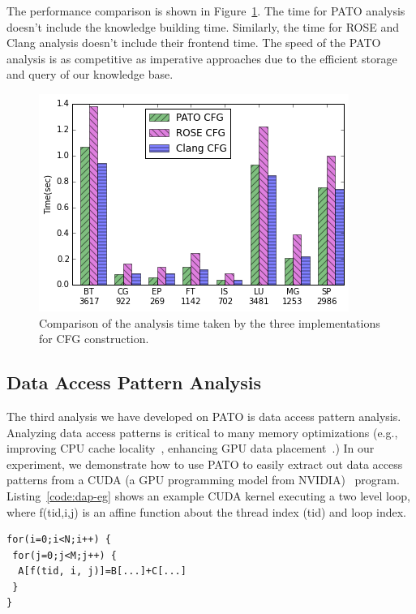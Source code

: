 The performance comparison is shown in Figure~\ref{fig:npb-cfg}.  The
time for PATO analysis doesn't include the knowledge building time.
Similarly, the time for ROSE and Clang analysis doesn't include their
frontend time.  The speed of the PATO analysis is as competitive as
imperative approaches due to the efficient storage and query of our
knowledge base.
\begin{figure}[h]
	\centering
	\includegraphics[width=.6\columnwidth]{graph/npb-cfg.png}
	\caption{Comparison of the analysis time taken by the three
          implementations for CFG construction.}
	\label{fig:npb-cfg}
\end{figure}

\subsection{Data Access Pattern Analysis}

The third analysis we have developed on PATO is data access pattern
analysis. Analyzing data access patterns is critical to many memory
optimizations (e.g., improving CPU cache
locality~\cite{kandemir1999improving}, enhancing GPU data
placement~\cite{Chen2014, Jang2011}.)  In our experiment, we
demonstrate how to use PATO to easily extract out data access patterns
from a CUDA (a GPU programming model from NVIDIA)~\cite{nvidia2011nvidia}
program.  Listing~\ref{code:dap-eg} shows an example
CUDA kernel executing a two level loop, where \textsf{f(tid,i,j)} is
an affine function about the thread index (\textsf{tid}) and loop
index. %
\begin{lstlisting}[xleftmargin=.1\columnwidth,
xrightmargin=.1\columnwidth,
caption=An example CUDA kernel loop, label=code:dap-eg]
for(i=0;i<N;i++) {
 for(j=0;j<M;j++) {
  A[f(tid, i, j)]=B[...]+C[...]
 }
}
\end{lstlisting}


